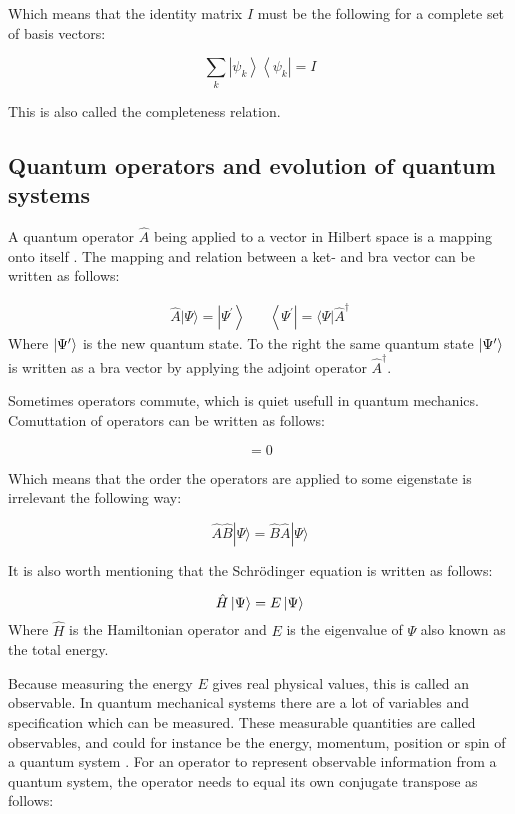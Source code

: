 \documentclass[../main.tex]{subfiles}
\begin{document}
Which means that the identity matrix $I$ must be the following for a complete set of basis vectors:

\begin{equation*}
    \sum_{k}\left|\psi_{k}\right\rangle\left\langle\psi_{k}\right|=I
\end{equation*}

This is also called the completeness relation.

\subsection{Quantum operators and evolution of quantum systems}
A quantum operator $\hat{A}$ being applied to a vector in Hilbert space is a mapping onto itself \cite[ch.~6.3]{hemmer2005kvantemekanikk}. The mapping and relation between a ket- and bra vector can be written as follows:

\begin{align*}
\hat{A}|\Psi\rangle=\left|\Psi^{\prime}\right\rangle && \left\langle\Psi^{\prime}\right|=\langle\Psi| \hat{A}^{\dagger}
\end{align*}
Where $\ket{\Psi^\prime}$ is the new quantum state. To the right the same quantum state $\ket{\Psi^\prime}$ is written as a bra vector by applying the adjoint operator $\hat{A}^\dagger$.

Sometimes operators commute, which is quiet usefull in quantum mechanics. Comuttation of operators can be written as follows:

\begin{equation*}
[\hat{A}, \hat{B}]=0
\end{equation*}

Which means that the order the operators are applied to some eigenstate is irrelevant the following way:

\begin{equation*}
\hat{A} \hat{B}|\Psi\rangle=\hat{B} \hat{A}|\Psi\rangle
\end{equation*}

It is also worth mentioning that the Schrödinger equation is written as follows:

\begin{equation*}
    \hat{H}\ket{\Psi}=E\ket{\Psi}
\end{equation*}
Where $\hat{H}$ is the Hamiltonian operator and $E$ is the eigenvalue of $\Psi$ also known as the total energy.

Because measuring the energy $E$ gives real physical values, this is called an observable. In quantum mechanical systems there are a lot of variables and specification which can be measured. These measurable quantities are called observables, and could for instance be the energy, momentum, position or spin of a quantum system \cite[ch.~13]{lecturenotes:cresser}. For an operator to represent observable information from a quantum system, the operator needs to equal its own conjugate transpose as follows:
\end{document}
